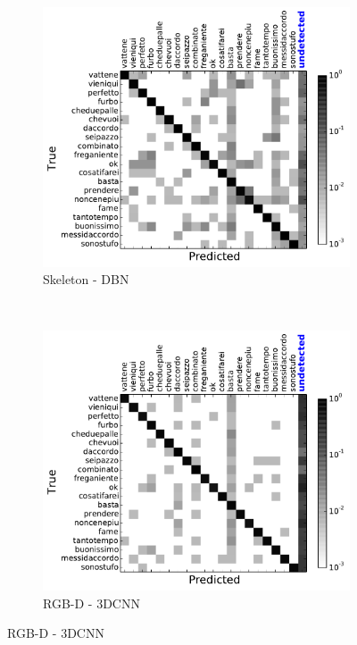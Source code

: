 \begin{figure}[t]
        \centering
        \begin{subfigure}[c]{.35\textwidth}
                \includegraphics[width=\textwidth]{images/cm/cm_sk}
\vspace*{-3mm}
                \caption{\small{Skeleton - DBN}}
                \label{sk_cm}
        \end{subfigure}%
        ~ %

        \begin{subfigure}[c]{0.35\textwidth}
                \includegraphics[width=\textwidth]{images/cm/cm_cnn}
\vspace*{-3mm}
                \caption{\small{RGB-D - 3DCNN}}
                \label{cnn_cm}
        \end{subfigure}


\end{figure}
